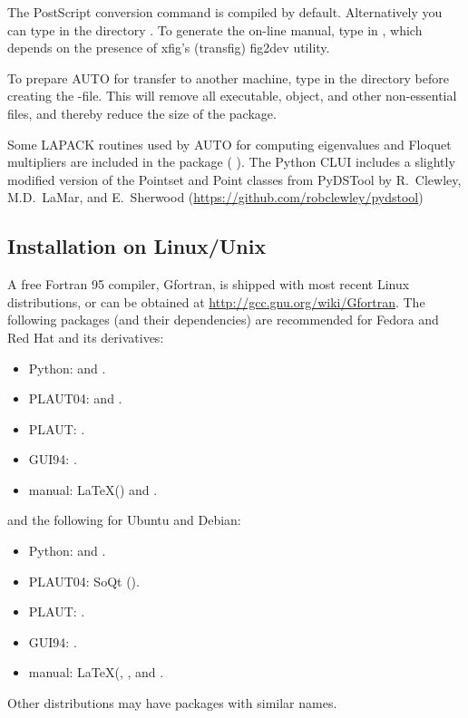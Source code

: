 \documentclass[12pt]{report}
\begin{document}
The PostScript conversion command  is compiled by
default. Alternatively you can type  in the directory
.
To generate the on-line manual, type  in
, which depends on the presence of xfig's
(transfig) fig2dev utility.

To prepare {\cal AUTO} for transfer to another machine,
type 
in the directory  before creating the -file. 
This will remove all executable, object, and other non-essential files, and
thereby reduce the size of the package.

Some {\cal LAPACK} routines used by {\cal AUTO} for computing eigenvalues and
Floquet multipliers are included in the package
( \citeyear{LAPACK:99}).
The Python CLUI includes a slightly modified version of the Pointset
and Point classes from PyDSTool by R.~Clewley, M.D.~LaMar, and E.~Sherwood
(\url{https://github.com/robclewley/pydstool})

\subsection{Installation on Linux/Unix}
A free Fortran 95 compiler, Gfortran, is shipped with most recent
Linux distributions, or can be obtained at 
\url{http://gcc.gnu.org/wiki/Gfortran}.
The following packages (and their dependencies) are recommended for
Fedora and Red Hat and its derivatives:
\begin{itemize}
\item Python:  and .
\item {\cal PLAUT04}:  and .
\item {\cal PLAUT}: .
\item GUI94: .
\item manual: \LaTeX () and .
\end{itemize}
and the following for Ubuntu and Debian:
\begin{itemize}
\item Python:  and .
\item {\cal PLAUT04}: SoQt ().
\item {\cal PLAUT}: .
\item GUI94: .
\item manual: \LaTeX (, , and .
\end{itemize}
Other distributions may have packages with similar names.
\end{document}
